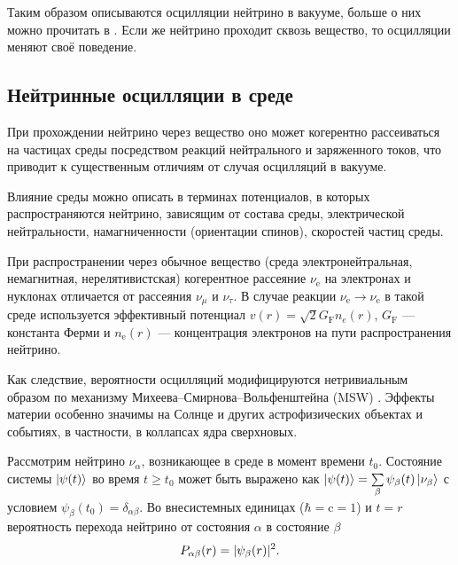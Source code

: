 \documentclass[12pt]{article}
\DeclarePairedDelimiter{\abs}{\lvert}{\rvert}
\begin{document}
Таким образом описываются осцилляции нейтрино в вакууме, больше о них можно прочитать в \cite{Gunti}. Если же нейтрино проходит сквозь вещество, то осцилляции меняют своё поведение.

\subsection*{Нейтринные осцилляции в среде}

При прохождении нейтрино через вещество оно может когерентно рассеиваться на
частицах среды посредством реакций нейтрального и заряженного токов, что
приводит к существенным отличиям от случая осцилляций в вакууме.

Влияние среды можно описать в терминах потенциалов, в которых распространяются
нейтрино, зависящим от состава среды, электрической нейтральности,
намагниченности (ориентации спинов), скоростей частиц среды.

При распространении через обычное вещество (среда электронейтральная,
немагнитная, нерелятивистская) когерентное рассеяние $\nu_{\text{e}}$ на
электронах и нуклонах отличается от рассеяния $\nu_{\mu}$ и $\nu_{\tau}$. В
случае реакции $\nu_{\text{e}}\to\nu_{\text{e}}$ в такой среде используется
эффективный потенциал $v(r)=\sqrt{2}G_{\text{F}}n_e(r)$, $G_{\text{F}}$ —
константа Ферми и $n_{\text{e}}(r)$ — концентрация электронов на пути
распространения нейтрино.

Как следствие, вероятности осцилляций модифицируются нетривиальным образом по
механизму Михеева–Смирнова–Вольфенштейна (MSW) \cite{MSW}. Эффекты материи особенно значимы
на Солнце и других астрофизических объектах и событиях, в частности, в коллапсах
ядра сверхновых.

Рассмотрим нейтрино $\nu_\alpha$, возникающее в среде в момент времени
$t_0$. Состояние системы $\ket{\psi(t)}$ во время $t\geqslant t_0$ может быть
выражено как $\ket{\psi(t)}=\sum\limits_\beta \psi_\beta(t)\ket{\nu_\beta}$ с условием
$\psi_\beta(t_0)=\delta_{\alpha\beta}$. Во внесистемных единицах
($\hbar=\text{c}=1$) и $t=r$ вероятность перехода нейтрино от состояния $\alpha$
в состояние $\beta$
\begin{equation}\label{prob}
  P_{\alpha\beta}(r)=\abs{\psi_\beta(r)}^2.
\end{equation}
\end{document}
